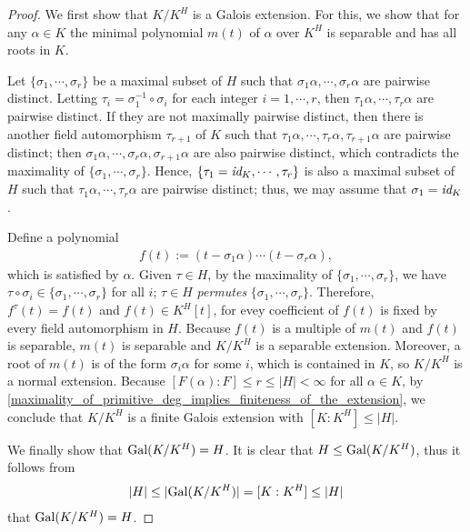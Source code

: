 \begin{proof}
    We first show that $K/K^H$ is a Galois extension.
    For this, we show that for any $\alpha\in K$ the minimal polynomial $m(t)$ of $\alpha$ over $K^H$ is separable and has all roots in $K$.
    
    \color{magenta}Let $\{\sigma_1, \cdots, \sigma_r\}$ be a maximal subset of $H$ such that $\sigma_1\alpha, \cdots, \sigma_r\alpha$ are pairwise distinct. \color{black}
    Letting $\tau_i=\sigma_1^{-1}\circ\sigma_i$ for each integer $i=1, \cdots, r$, then $\tau_1\alpha, \cdots, \tau_r\alpha$ are pairwise distinct.
    If they are not maximally pairwise distinct, then there is another field automorphism $\tau_{r+1}$ of $K$ such that $\tau_1\alpha, \cdots, \tau_r\alpha, \tau_{r+1}\alpha$ are pairwise distinct; then $\sigma_1\alpha, \cdots, \sigma_r\alpha, \sigma_{r+1}\alpha$ are also pairwise distinct, which contradicts the maximality of $\{\sigma_1, \cdots, \sigma_r\}$.
    Hence, $\{\tau_1=\textit{id}_{K}, \cdots, \tau_r\}$ is also a maximal subset of $H$ such that $\tau_1\alpha, \cdots, \tau_r\alpha$ are pairwise distinct; thus, we may assume that $\sigma_1=\textit{id}_{K}$.

    Define a polynomial
    \begin{align*}
        f(t):=(t-\sigma_1\alpha)\cdots(t-\sigma_r\alpha),
    \end{align*}
    which is satisfied by $\alpha$.
    Given $\tau\in H$, by the maximality of $\{\sigma_1, \cdots, \sigma_r\}$, we have $\tau\circ\sigma_i\in\{\sigma_1, \cdots, \sigma_r\}$ for all $i$; $\tau\in H$ \textit{permutes} $\{\sigma_1, \cdots, \sigma_r\}$.
    Therefore, $f^\tau(t)=f(t)$ and $f(t)\in K^H[t]$, for evey coefficient of $f(t)$ is fixed by every field automorphism in $H$.
    Because $f(t)$ is a multiple of $m(t)$ and $f(t)$ is separable, $m(t)$ is separable and $K/K^H$ is a separable extension.
    Moreover, a root of $m(t)$ is of the form $\sigma_i\alpha$ for some $i$, which is contained in $K$, so $K/K^H$ is a normal extension.
    Because $[F(\alpha): F]\leq r\leq |H|<\infty$ for all $\alpha\in K$, by \cref{maximality_of_primitive_deg_implies_finiteness_of_the_extension}, we conclude that $K/K^H$ is a finite Galois extension with $[K:K^H]\leq |H|$.

    We finally show that ${\textrm{Gal}({K/K^H})}=H$.
    It is clear that $H\leq{\textrm{Gal}({K/K^H})}$, thus it follows from
    \begin{align*}
        |H|\leq|{\textrm{Gal}({K/K^H})}|=[K:K^H]\leq|H|
    \end{align*}
    that ${\textrm{Gal}({K/K^H})}=H$.
\end{proof}